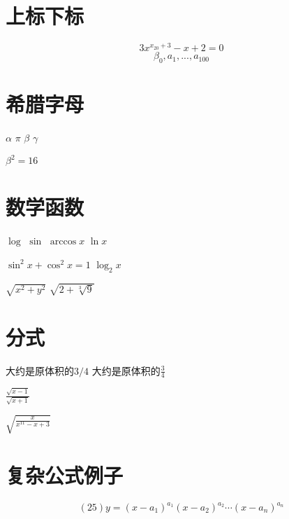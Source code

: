 \documentclass{article}
\begin{document}
	\section{上标下标}
	$$3x^{x_{20} + 3} - x + 2 = 0$$
	$$\beta_0,a_1,...,a_{100}$$
	\section{希腊字母} 
	$\alpha$
	$\pi$
	$\beta$
	$\gamma$

	$\beta^2 = 16$

	\section{数学函数}
	$\log$
	$\sin$
	$\arccos x$
	$\ln x$

	$\sin^2 x+\cos^2 x = 1$
	$\log_2 x$

	$\sqrt{x ^ 2 + y ^ 2}$
	$\sqrt{2 + \sqrt[3]{9}}$ %

	\section{分式}
	大约是原体积的$3/4$
大约是原体积的$\frac{3}{4}$

	$\frac{\sqrt{x-1}}{\sqrt{x+1}}$

	$\sqrt{\frac{x}{x^{11} - x + 3}}$

	\section{复杂公式例子}
	\[
	(25) y=\left(x-a_{1}\right)^{a_{1}}\left(x-a_{2}\right)^{a_{2}} \cdots\left(x-a_{n}\right)^{a_{n}}
	\]
\end{document}
